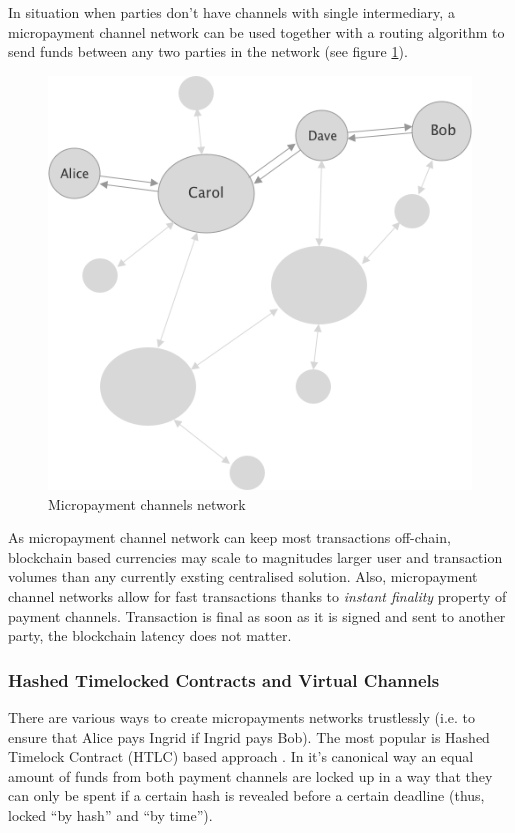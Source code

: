 \documentclass[a4paper,12pt]{article}
\begin{document}
In situation when parties don't have channels with single intermediary, a 
micropayment channel network can be used together with a routing algorithm to 
send funds between any two parties in the network (see figure \ref{img:lightning}).

\begin{figure}[H]
    \centering
    \includegraphics[scale=0.5]{../img/lightning-network}
    \caption{Micropayment channels network}
    \label{img:lightning}
\end{figure}

As micropayment channel network can keep most transactions off-chain, blockchain 
based currencies may scale to magnitudes larger user and transaction volumes than 
any currently exsting centralised solution. Also, micropayment channel networks 
allow for fast transactions thanks to \textit{instant finality} property of 
payment channels. Transaction is final as soon as it is signed and sent to 
another party, the blockchain latency does not matter. \\

\subsubsection{Hashed Timelocked Contracts and Virtual Channels}

There are various ways to create micropayments networks trustlessly (i.e. to 
ensure that Alice pays Ingrid if Ingrid pays Bob). The most popular is Hashed 
Timelock Contract (HTLC) based approach \cite{lightning}. In it's canonical way 
an equal amount of funds from both payment channels are locked up in a way that 
they can only be spent if a certain hash is revealed before a certain deadline 
(thus, locked “by hash” and “by time”). 
\end{document}
